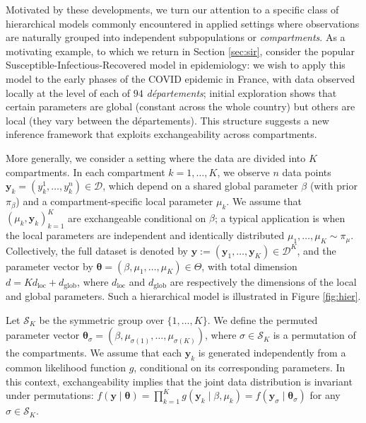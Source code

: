 \documentclass[lineno]{biometrika}
\def\dataspace{\mathcal{D}}
\def\dglob{d_{\mathrm{\scriptscriptstyle glob}}}
\def\dloc{d_{\mathrm{\scriptscriptstyle loc}}}
\def\globparam{\beta}
\def\locparam{\mu}
\def\obsdata{\mathbf{y}}
\def\obsdataUn{y}
\def\param{\boldsymbol{\theta}}
\def\parset{\Theta}
\begin{document}
Motivated by these developments, we turn our attention to a specific class of hierarchical models commonly encountered in applied settings where observations are naturally grouped into independent subpopulations or \emph{compartments}. 
As a motivating example, to which we return in Section \ref{sec:sir}, consider the popular Susceptible-Infectious-Recovered model in epidemiology: we wish to apply this model to the early phases of the COVID epidemic in France, with data observed locally at the level of each of $94$ \emph{d\'epartements}; initial exploration shows that certain parameters are global (constant across the whole country) but others are local (they vary between the départements).   
This structure suggests a new inference framework that exploits exchangeability across compartments.

More generally, we consider a setting where the data are divided into $K$ compartments. In each compartment $k = 1, \dots, K$, we observe $n$ data points $\obsdata_k = (\obsdataUn_k^1, \dots, \obsdataUn_k^n) \in \dataspace$, which depend on a shared global parameter $\globparam$ (with prior $\pi_\globparam$) and a compartment-specific local parameter $\locparam_k$. We assume that $(\mu_k, \obsdata_k)_{k=1}^K$ are exchangeable conditional on $\globparam$; a typical application is when the local parameters are independent and identically distributed $\mu_1,\ldots,\mu_K\sim\pi_\mu$. Collectively, the full dataset is denoted by $\obsdata := (\obsdata_1, \dots, \obsdata_K) \in \dataspace^K$, and the parameter vector by $\param = (\globparam, \locparam_{1}, \dots, \locparam_{K}) \in \parset$, with total dimension $d = K\dloc + \dglob$, where $\dloc$ and $\dglob$ are respectively the dimensions of the local and global parameters. 
Such a hierarchical model is illustrated in Figure \ref{fig:hier}.

Let $\mathcal S_K$ be the symmetric group over $\{1,\ldots,K\}$. 
We define the permuted parameter vector $\param_{\sigma} = (\globparam, \locparam_{\sigma(1)}, \dots, \locparam_{\sigma(K)})$, where $\sigma \in \mathcal{S}_K$ is a permutation of the compartments. We assume that each $\obsdata_k$ is generated independently from a common likelihood function $g$, conditional on its corresponding parameters. In this context, exchangeability implies that the joint data distribution is invariant under permutations: $f(\obsdata\mid \param) = \prod_{k = 1}^K g(\obsdata_k\mid \globparam,\locparam_k) = f(\obsdata_{\sigma} \mid \param_{\sigma})$ for any $\sigma \in \mathcal{S}_K$. 
\end{document}
